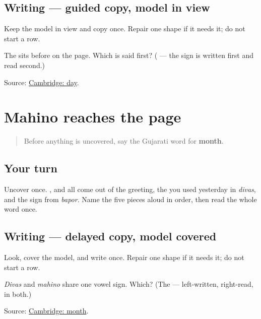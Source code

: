 \subsection*{Writing — guided copy, model in view}
Keep the model in view and copy \textbf{} once. Repair one shape if it needs it; do not start a row.

\begin{tcolorbox}[breakable,colback=teal!4,colframe=teal!35!black,title={Before you move on}]
The \textbf{} sits before \textbf{} on the page. Which is said first? (\textbf{} — the sign is written first and read second.)

Source: \href{https://dictionary.cambridge.org/dictionary/english-gujarati/day}{Cambridge: day}.
\end{tcolorbox}
\section[Practice]{Mahino reaches the page}

\label{lesson:GU-C25-mahino}



\begin{quote}
Before anything is uncovered, say the Gujarati word for \textbf{month}.
\end{quote}

\subsection*{Your turn}
Uncover \textbf{} once. \textbf{}, \textbf{} and \textbf{} all come out of the greeting, the \textbf{} you used yesterday in \emph{divas}, and the \textbf{} sign from \emph{bapor}. Name the five pieces aloud in order, then read the whole word once.

\subsection*{Writing — delayed copy, model covered}
Look, cover the model, and write \textbf{} once. Repair one shape if it needs it; do not start a row.

\begin{tcolorbox}[breakable,colback=teal!4,colframe=teal!35!black,title={Before you move on}]
\emph{Divas} and \emph{mahino} share one vowel sign. Which? (The \textbf{} — left-written, right-read, in both.)

Source: \href{https://dictionary.cambridge.org/dictionary/english-gujarati/month}{Cambridge: month}.
\end{tcolorbox}
